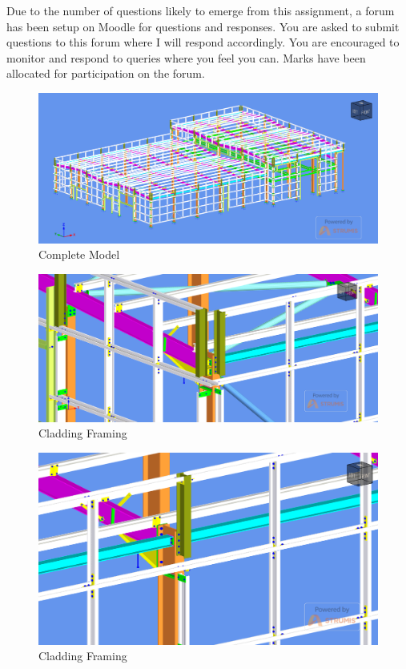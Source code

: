 Due to the number of questions likely to emerge from this assignment, a forum has been setup on Moodle for questions and responses.  You are asked to submit questions to this forum where I will respond accordingly.  You are encouraged to monitor and respond to queries where you feel you can.  Marks have been allocated for participation on the forum.




\begin{figure}
	\centering
	\includegraphics[width=1.0\linewidth]{a3img/1.png}
	\caption{Complete Model}
	\label{fig:ass3img1}
\end{figure}

\begin{figure}
	\centering
	\includegraphics[width=1.0\linewidth]{a3img/2.png}
	\caption{Cladding Framing}
	\label{fig:ass3img2}
\end{figure}

\begin{figure}
	\centering
	\includegraphics[width=1.0\linewidth]{a3img/3.png}
	\caption{Cladding Framing}
	\label{fig:ass3img3}
\end{figure}

